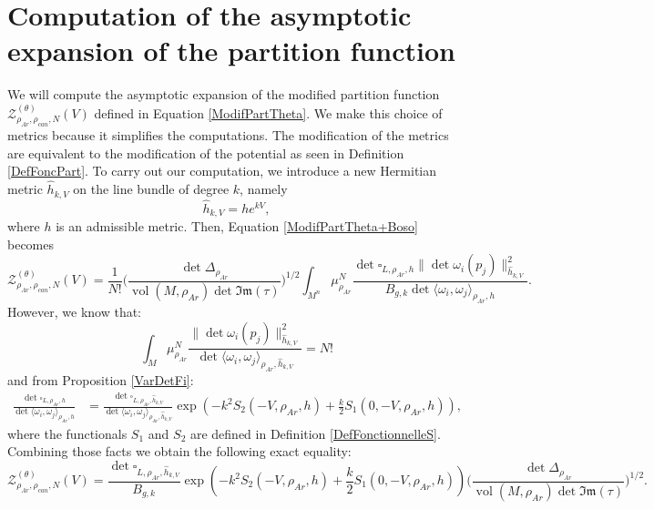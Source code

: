 \documentclass{article}
\theoremstyle{definition}
\theoremstyle{remark}
\DeclareMathOperator{\vol}{vol}
\begin{document}
\section{Computation of the asymptotic expansion of the partition function}\label{SectionCalcul}
We will compute the asymptotic expansion of the modified partition function $\mathcal{Z}_{\rho_{Ar},\rho_{can},N}^{(\theta)}(V)$ defined in Equation \eqref{ModifPartTheta}. We make this choice of metrics because it simplifies the computations. The modification of the metrics are equivalent to the modification of the potential as seen in Definition \ref{DefFoncPart}. To carry out our computation, we introduce a new Hermitian metric $\hat{h}_{k,V}$ on the line bundle of degree $k$, namely \begin{equation}\label{eq:HermitianPotential} \hat{h}_{k,V}=he^{kV},
\end{equation} where $h$ is an admissible metric. Then, Equation \eqref{ModifPartTheta+Boso} becomes
\begin{equation}
    \mathcal{Z}_{\rho_{Ar},\rho_{can},N}^{(\theta)}(V)=\frac{1}{N!}\bigg(\frac{\det\Delta_{\rho_{Ar}}}{\vol(M,\rho_{Ar}) \det \mathfrak{Im}(\tau)}\bigg)^{1/2}\int_{M^{n}}\mu_{\rho_{Ar}}^{N}\frac{\det\square_{L,\rho_{Ar},h} \|\det \omega_{i}(p_{j})\|^{2}_{\hat{h}_{k,V}}}{B_{g,k}\det\langle \omega_{i},\omega_{j}\rangle_{\rho_{Ar},h}}.
\end{equation}
However, we know that: 
$$\int_{M}\mu_{\rho_{Ar}}^{N}\frac{\|\det\omega_{i}(p_{j})\|^{2}_{\hat{h}_{k,V}}}{\det\langle \omega_{i},\omega_{j}\rangle_{\rho_{Ar},\hat{h}_{k,V}}}=N!$$ and from Proposition \ref{VarDetFi}:
\begin{align*}
    \frac{\det\square_{L,\rho_{Ar},{h}}}{\det\langle \omega_{i},\omega_{j} \rangle_{\rho_{Ar},h}}&=\frac{\det\square_{L,\rho_{Ar},\hat{h}_{k,V}}}{\det\langle \omega_{i},\omega_{j}\rangle_{\rho_{Ar},\hat{h}_{k,V}}}\exp\left(-k^{2}S_{2}(-V,\rho_{Ar},h)+\frac{k}{2}S_{1}(0,-V,\rho_{Ar},h) \right),
\end{align*}
where the functionals $S_{1}$ and $S_{2}$ are defined in Definition \ref{DefFonctionnelleS}.
Combining those facts we obtain the following exact equality: \begin{equation}
    \mathcal{Z}_{\rho_{Ar},\rho_{can},N}^{(\theta)}(V)=\frac{\det\square_{L,\rho_{Ar},\hat{h}_{k,V}} }{B_{g,k}}\exp\left(-k^{2}S_{2}(-V,\rho_{Ar},h)+\frac{k}{2}S_{1}(0,-V,\rho_{Ar},h) \right)\bigg(\frac{\det\Delta_{\rho_{Ar}}}{\vol(M,\rho_{Ar}) \det \mathfrak{Im}(\tau)}\bigg)^{1/2}.
\end{equation}
\end{document}

